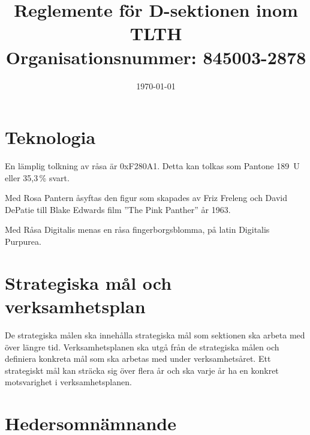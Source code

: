 \documentclass[pdfbookmarks,a4paper,11pt]{article}
\title{Reglemente för D-sektionen inom TLTH\\ Organisationsnummer: 845003-2878}
\date{\today}
\newlength{\itemcollength}
\newenvironment{reglemlista}{%
  \begin{list}{}{%
      \setlength{\labelwidth}{\itemcollength}%
      \setlength{\leftmargin}{\labelwidth + \labelsep}%
      \renewcommand{\makelabel}[1]{%
        \raisebox{0pt}[1ex][0pt]{%
          \makebox[\labelwidth][l]{%
            \parbox[t]{\itemcollength}{%
              \raggedright\hspace{0pt}##1}}}\hfill}%
      }}{%
  \end{list}}
\begin{document}
\maketitle

\section{Teknologia}

\begin{reglemlista}

	\item[Råsa]
	En lämplig tolkning av råsa är 0xF280A1. Detta kan tolkas som Pantone
	189~U eller 35,3\,\% svart.

	\item[Rosa Pantern]
	Med Rosa Pantern åsyftas den figur som skapades av Friz Freleng och David
	DePatie till Blake Edwards film ''The Pink Panther'' år 1963.

	\item[Råsa Digitalis]
	Med Råsa Digitalis menas en råsa fingerborgsblomma, på latin Digitalis Purpurea.

\end{reglemlista}


\section{Strategiska mål och verksamhetsplan}

\begin{reglemlista}

	\item[Strategiska mål och verksamhetsplan]
	De strategiska målen ska innehålla strategiska mål som sektionen ska arbeta med
över längre tid. Verksamhetsplanen ska utgå från de strategiska målen och definiera konkreta mål som ska arbetas med under verksamhetsåret. Ett strategiskt mål
kan sträcka sig över flera år och ska varje år ha en konkret motsvarighet i verksamhetsplanen.

\end{reglemlista}



\section{Hedersomnämnande}
\end{document}

